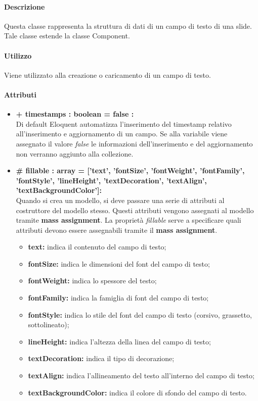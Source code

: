	\paragraph{Descrizione}
	Questa classe rappresenta la struttura di dati di un campo di testo di una slide. Tale classe estende la classe Component.
	
	\paragraph{Utilizzo}
	Viene utilizzato alla creazione o caricamento di un campo di testo.
	
	\paragraph{Attributi}
	\begin{itemize}
		\item \textbf{+ timestamps : boolean = false :}\\
		Di default Eloquent automatizza l'inserimento del timestamp relativo all'inserimento e aggiornamento di un campo. Se alla variabile viene assegnato il valore \textit{false} le informazioni dell'inserimento e del aggiornamento non verranno aggiunto alla collezione.
		\item \textbf{\# fillable : array = [’text’, ’fontSize’, ’fontWeight’, ’fontFamily’, ’fontStyle’, ’lineHeight’, ’textDecoration’, ’textAlign’, ’textBackgroundColor']:}\\
		Quando si crea un modello, si deve passare una serie di attributi al costruttore del modello stesso. Questi attributi vengono assegnati al modello tramite \textbf{mass assignment}. La proprietà \textit{fillable} serve a specificare quali attributi devono essere assegnabili tramite il \textbf{mass assignment}.
		\begin{itemize}
			\item \textbf{text:} indica il contenuto del campo di testo;
			\item \textbf{fontSize:} indica le dimensioni del font del campo di testo;
			\item \textbf{fontWeight:} indica lo spessore del testo;
			\item \textbf{fontFamily:} indica la famiglia di font del campo di testo;
			\item \textbf{fontStyle:} indica lo stile del font del campo di testo (corsivo, grassetto, sottolineato);
			\item \textbf{lineHeight:} indica l'altezza della linea del campo di testo;
			\item \textbf{textDecoration:} indica il tipo di decorazione;
			\item \textbf{textAlign:} indica l'allineamento del testo all'interno del campo di testo;
			\item \textbf{textBackgroundColor:} indica il colore di sfondo del campo di testo.
		\end{itemize}
	\end{itemize}
\newpage


